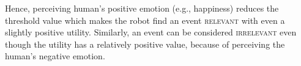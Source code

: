 \documentclass{sig-alternate-05-2015}
\begin{document}
Hence, perceiving human's positive emotion (e.g., happiness) reduces the
threshold value which makes the robot find an event \textsc{relevant} with even
a slightly positive utility. Similarly, an event can be considered
\textsc{irrelevant} even though the utility has a relatively positive value,
because of perceiving the human's negative emotion.

% 
% 
% 
\end{document}
